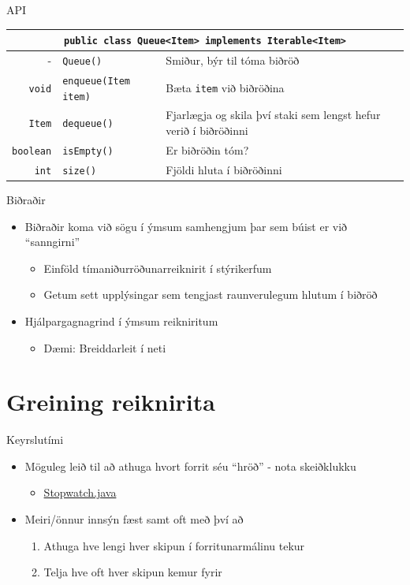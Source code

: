 \documentclass[handout]{beamer}
\begin{document}
\begin{frame}{API}
\begin{center}
\begin{tabularx}{\textwidth}{rlX}
\toprule
\multicolumn{3}{c}{\texttt{public class Queue<Item> implements Iterable<Item>}}\\
\midrule
-&\texttt{Queue()}& Smiður, býr til tóma biðröð\\
\texttt{void}&\texttt{enqueue(Item item)}&Bæta \texttt{item} við biðröðina\\
\texttt{Item}&\texttt{dequeue()}&Fjarlægja og skila því staki sem lengst hefur verið í biðröðinni\\
\texttt{boolean}&\texttt{isEmpty()}&Er biðröðin tóm?\\
\texttt{int}&\texttt{size()}&Fjöldi hluta í biðröðinni\\
\bottomrule
\end{tabularx}
\end{center}
\end{frame}

\begin{frame}{Biðraðir}
\begin{itemize}
 \item Biðraðir koma við sögu í ýmsum samhengjum þar sem búist er við ``sanngirni''
 \begin{itemize}
  \item Einföld tímaniðurröðunarreiknirit í stýrikerfum
  \item Getum sett upplýsingar sem tengjast raunverulegum hlutum í biðröð
 \end{itemize}
 \item Hjálpargagnagrind í ýmsum reikniritum
 \begin{itemize}
  \item Dæmi: Breiddarleit í neti
 \end{itemize}
\end{itemize}
\end{frame}

\section{Greining reiknirita}

\begin{frame}{Keyrslutími}
\begin{itemize}
 \item Möguleg leið til að athuga hvort forrit séu ``hröð'' - nota skeiðklukku
 \begin{itemize}
  \item \href{http://algs4.cs.princeton.edu/code/edu/princeton/cs/algs4/Stopwatch.java.html}{Stopwatch.java}
 \end{itemize}
 \item Meiri/önnur innsýn fæst samt oft með því að
 \begin{enumerate}
  \item Athuga hve lengi hver skipun í forritunarmálinu tekur
  \item Telja hve oft hver skipun kemur fyrir
 \end{enumerate}
\end{itemize}
\end{frame}
\end{document}
